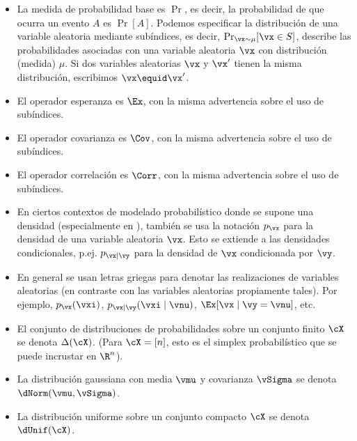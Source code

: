 \documentclass[../book-main_es.tex]{subfiles}
\begin{document}
\begin{itemize}
    \item La medida de probabilidad base es \(\Pr\), es decir, la
        probabilidad de que ocurra un evento \(A\) es \(\Pr[A]\). Podemos
        especificar la distribución de una variable aleatoria mediante
        subíndices, es decir, \(\Pr_{\vx \sim \mu}[\vx \in S]\), describe
        las probabilidades asociadas con una variable aleatoria $\vx$ con
        distribución (medida) $\mu$. Si dos variables aleatorias $\vx$ y $\vx'$
        tienen la misma distribución, escribimos $\vx \equid \vx'$.
    \item El operador esperanza es \(\Ex\), con la misma advertencia sobre el 
        uso de subíndices. 
    \item El operador covarianza es \(\Cov\), con la misma advertencia sobre 
        el uso de subíndices.
    \item El operador correlación es \(\Corr\), con la misma advertencia sobre 
        el uso de subíndices.
    \item  En ciertos contextos de modelado probabilístico donde 
        se supone una densidad (especialmente en
        ), también se usa la 
        notación $p_{\vx}$ para la densidad de una variable aleatoria $\vx$. 
        Esto se extiende a las densidades condicionales, p.ej. 
        $p_{\vx \mid \vy}$ para la densidad de $\vx$ condicionada por $\vy$.
    \item En general se usan letras griegas para denotar las realizaciones
        de variables aleatorias (en contraste con las variables 
        aleatorias propiamente tales). Por ejemplo, $p_{\vx}(\vxi)$, $p_{\vx \mid
        \vy}(\vxi \mid \vnu)$, $\Ex[\vx \mid \vy=\vnu]$, etc.
    \item El conjunto de distribuciones de probabilidades sobre un conjunto finito        %
        \(\cX\) se denota
        \(\Delta(\cX)\). (Para \(\cX = [n]\), esto es el simplex probabilístico
        que se puede incrustar en \(\R^{n}\)).
    \item La distribución gaussiana con media \(\vmu\) y covarianza
        \(\vSigma\) se denota \(\dNorm(\vmu, \vSigma)\).
    \item La distribución uniforme sobre un conjunto compacto \(\cX\) se
        denota \(\dUnif(\cX)\).
\end{itemize}
\end{document}

